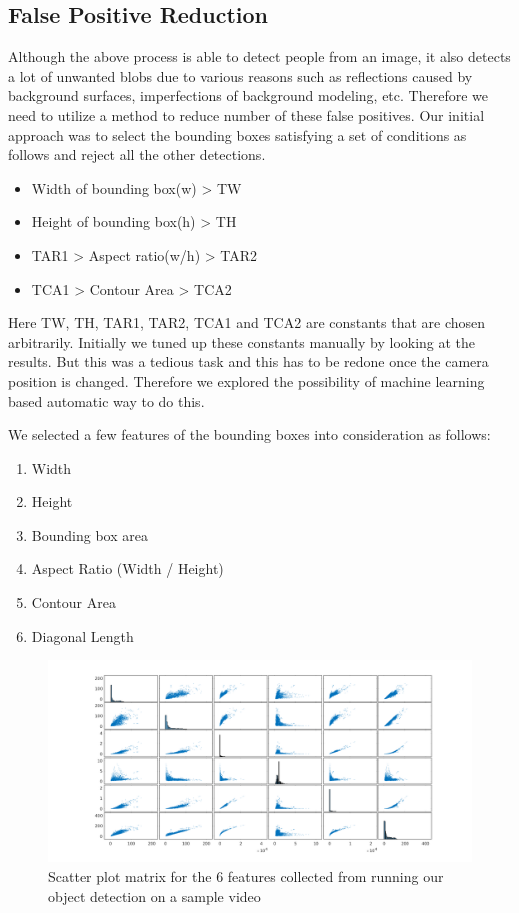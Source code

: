 \documentclass[12pt,a4paper]{report}
\begin{document}
\subsection{False Positive Reduction}
Although the above process is able to detect people from an image, it also detects a lot of unwanted blobs due to various reasons such as reflections caused by background surfaces, imperfections of background modeling, etc. Therefore we need to utilize a method to reduce number of these false positives. Our initial approach was to select the bounding boxes satisfying a set of conditions as follows and reject all the other detections.
\begin{itemize}
\item Width of bounding box(w) > TW
\item Height of bounding box(h) > TH
\item TAR1 > Aspect ratio(w/h) > TAR2
\item TCA1 > Contour Area > TCA2
\end{itemize}
Here TW, TH, TAR1, TAR2, TCA1 and TCA2 are constants that are chosen arbitrarily. Initially we tuned up these constants manually by looking at the results. But this was a tedious task and this has to be redone once the camera position is changed. Therefore we explored the possibility of machine learning based automatic way to do this.

\noindent We selected a few features of the bounding boxes into consideration as follows:
\begin{enumerate}
\item Width
\item Height
\item Bounding box area
\item Aspect Ratio (Width / Height)
\item Contour Area
\item Diagonal Length
\end{enumerate}

\begin{figure}[H]
\includegraphics[width=\textwidth]{pca/scatter_plots_pca.png}
\centering
\caption{Scatter plot matrix for the 6 features collected from running our object detection on a sample video}
\label{pca1}
\end{figure}
\end{document}
